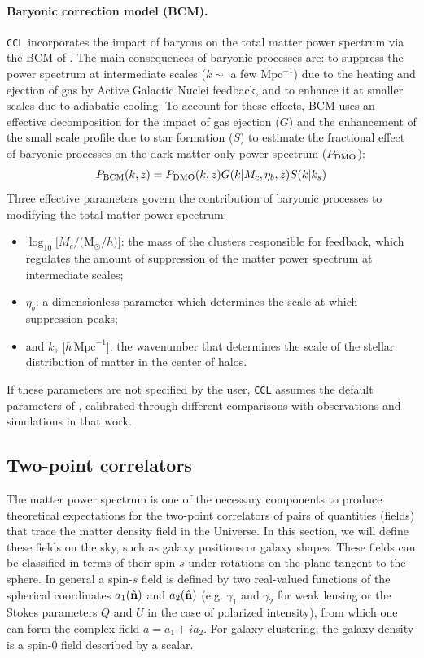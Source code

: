 \documentclass[\docopts]{\docclass}
\newcommand{\nv}{\hat{\bf n}}
\newcommand{\ccl}{{\tt CCL}\xspace}
\begin{document}
\paragraph{\bf Baryonic correction model (BCM).} \ccl incorporates the impact of baryons on the total matter power spectrum via the BCM of \citet{Schneider15}. The main consequences of baryonic processes are: to suppress the power spectrum at intermediate scales ($k\sim$ a few $\text{Mpc}^{-1}$) due to the heating and ejection of gas by Active Galactic Nuclei feedback, and to enhance it at smaller scales due to adiabatic cooling. To account for these effects, BCM uses an effective decomposition for the impact of gas ejection ($G$) and the enhancement of the small scale profile due to star formation ($S$) to estimate the fractional effect of baryonic processes on the dark matter-only power spectrum ($P_{\rm DMO}$):
\begin{equation}
  P_{\rm BCM}(k,z)=P_{\rm DMO}(k,z) G(k|M_c,\eta_b,z)S(k|k_s)
  \label{eq:bcm}
\end{equation}
Three effective parameters govern the contribution of baryonic processes to modifying the total matter power spectrum:
 \begin{itemize}
   \item $\log_{10} [M_c/($M$_\odot/h)]$: the mass of the clusters responsible for feedback, which regulates the amount of suppression of the matter power spectrum at intermediate scales;
   \item $\eta_b$: a dimensionless parameter which determines the scale at which suppression peaks;
   \item and $k_s$ [$h\,\text{Mpc}^{-1}$]: the wavenumber that determines the scale of the stellar distribution of matter in the center of halos.
 \end{itemize}
 If these parameters are not specified by the user, \ccl assumes the default parameters of \citet{Schneider15}, calibrated through different comparisons with observations and simulations in that work.

\subsection{Two-point correlators}\label{ss:2point}

The matter power spectrum is one of the necessary components to produce theoretical expectations for the two-point correlators of pairs of quantities (fields) that trace the matter density field in the Universe. In this section, we will define these fields on the sky, such as galaxy positions or galaxy shapes. These fields can be classified in terms of their spin $s$ under rotations on the plane tangent to the sphere. In general a spin-$s$ field is defined by two real-valued functions of the spherical coordinates $a_1(\nv)$ and $a_2(\nv)$ (e.g. $\gamma_1$ and $\gamma_2$ for weak lensing or the Stokes parameters $Q$ and $U$ in the case of polarized intensity), from which one can form the complex field $a=a_1+ia_2$. For galaxy clustering, the galaxy density is a spin-$0$ field described by a scalar.
\end{document}
